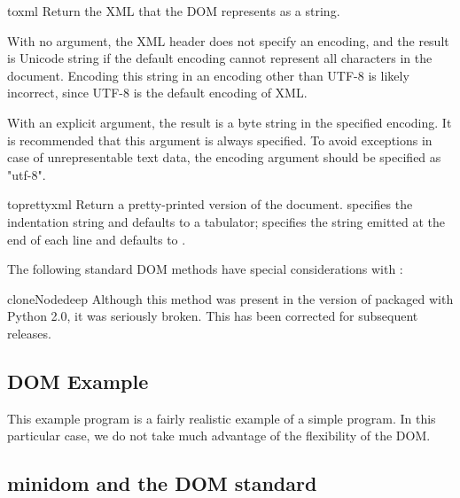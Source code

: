 \begin{methoddesc}[Node]{toxml}{}
Return the XML that the DOM represents as a string.

With no argument, the XML header does not specify an encoding, and the
result is Unicode string if the default encoding cannot represent all
characters in the document. Encoding this string in an encoding other
than UTF-8 is likely incorrect, since UTF-8 is the default encoding of
XML.

With an explicit  argument, the result is a byte string
in the specified encoding. It is recommended that this argument is
always specified. To avoid  exceptions in case of
unrepresentable text data, the encoding argument should be specified
as "utf-8".

\end{methoddesc}

\begin{methoddesc}[Node]{toprettyxml}{}
Return a pretty-printed version of the document.  specifies
the indentation string and defaults to a tabulator;  specifies
the string emitted at the end of each line and defaults to .

\end{methoddesc}

The following standard DOM methods have special considerations with
:

\begin{methoddesc}[Node]{cloneNode}{deep}
Although this method was present in the version of
 packaged with Python 2.0, it was seriously
broken.  This has been corrected for subsequent releases.
\end{methoddesc}


\subsection{DOM Example \label{dom-example}}

This example program is a fairly realistic example of a simple
program. In this particular case, we do not take much advantage
of the flexibility of the DOM.




\subsection{minidom and the DOM standard \label{minidom-and-dom}}

